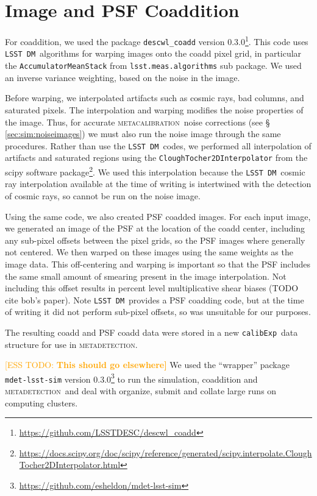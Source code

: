 \documentclass[iop, twocolappendix, appendixfloats, numberedappendix, apj]{hackemulateapj}
\newcommand{\esstodo}[1]{\textcolor{orange}{[ESS TODO: \bf #1]}}
\newcommand{\calibexp}{\texttt{calibExp}}
\newcommand{\dm}{\texttt{LSST DM}}
\newcommand{\mcal}{\textsc{metacalibration}}
\newcommand{\mdet}{\textsc{metadetection}}
\begin{document}
\section{Image and PSF Coaddition} \label{sec:coadding}

For coaddition, we used the package \texttt{descwl\_coadd} version
0.3.0\footnote{\url{https://github.com/LSSTDESC/descwl_coadd}}.  This code uses
\dm\ algorithms for warping images onto the coadd pixel grid, in particular the
\texttt{AccumulatorMeanStack} from \texttt{lsst.meas.algorithms} sub package.
We used an inverse variance weighting, based on the noise in the image.

Before warping, we interpolated artifacts such as cosmic rays, bad columns, and
saturated pixels.  The interpolation and warping modifies the noise properties
of the image.  Thus, for accurate \mcal\ noise corrections (see \S
\ref{sec:sim:noiseimages}) we must also run the noise image through the same
procedures.  Rather than use the \dm\ codes, we performed all interpolation of
artifacts and saturated regions using the \texttt{CloughTocher2DInterpolator}
from the scipy software
package\footnote{\url{https://docs.scipy.org/doc/scipy/reference/generated/scipy.interpolate.CloughTocher2DInterpolator.html}}.
We used this interpolation because the \dm\ cosmic ray interpolation available
at the time of writing is intertwined with the detection of cosmic rays, so
cannot be run on the noise image.

Using the same code, we also created PSF coadded images.  For each input image,
we generated an image of the PSF at the location of the coadd center, including
any sub-pixel offsets between the pixel grids, so the PSF images where
generally not centered.  We then warped on these images using the same weights
as the image data.  This off-centering and warping is important so that the PSF
includes the same small amount of smearing present in the image interpolation.
Not including this offset results in percent level multiplicative shear biases
(TODO cite bob's paper).  Note \dm\ provides a PSF coadding code, but at the
time of writing it did not perform sub-pixel offsets, so was unsuitable for
our purposes.

The resulting coadd and PSF coadd data were stored in a new \calibexp\ data
structure for use in \mdet.

\esstodo{This should go elsewhere}  We used the ``wrapper'' package
\texttt{mdet-lsst-sim} version
0.3.0\footnote{\url{https://github.com/esheldon/mdet-lsst-sim}} to run the
simulation, coaddition and \mdet\ and deal with organize, submit and collate
large runs on computing clusters.
\end{document}
